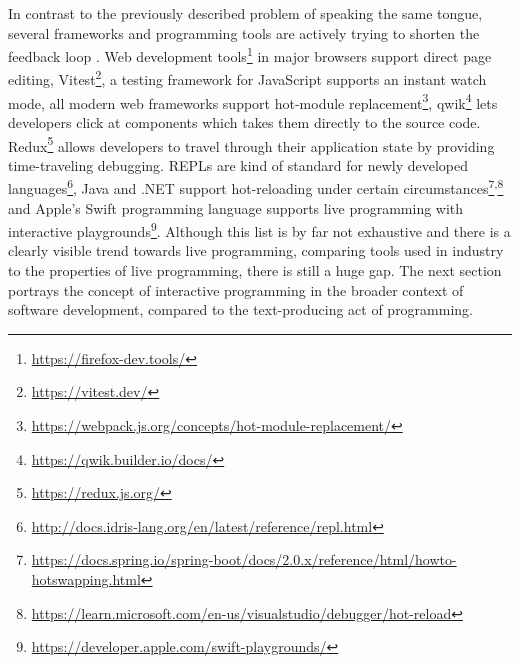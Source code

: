 In contrast to the previously described problem of speaking the same tongue, several frameworks and programming tools are actively trying to shorten the feedback loop \cite{kubelka_road_2018}.
Web development tools\footnote{\url{https://firefox-dev.tools/}} in major browsers support direct page editing, Vitest\footnote{\url{https://vitest.dev/}}, a testing framework for JavaScript supports an instant watch mode, all modern web frameworks support hot-module replacement\footnote{\url{https://webpack.js.org/concepts/hot-module-replacement/}}, qwik\footnote{\url{https://qwik.builder.io/docs/}} lets developers click at components which takes them directly to the source code. Redux\footnote{\url{https://redux.js.org/}} allows developers to travel through their application state by providing time-traveling debugging.
REPLs are kind of standard for newly developed languages\footnote{\url{http://docs.idris-lang.org/en/latest/reference/repl.html}}, Java and .NET support hot-reloading under certain circumstances\footnote{\url{https://docs.spring.io/spring-boot/docs/2.0.x/reference/html/howto-hotswapping.html}}\textsuperscript{,}\footnote{\url{https://learn.microsoft.com/en-us/visualstudio/debugger/hot-reload}} and Apple's Swift programming language supports live programming with interactive playgrounds\footnote{\url{https://developer.apple.com/swift-playgrounds/}}.
Although this list is by far not exhaustive and there is a clearly visible trend towards live programming, comparing tools used in industry to the properties of live programming, there is still a huge gap.
The next section portrays the concept of interactive programming in the broader context of software development, compared to the text-producing act of programming.




